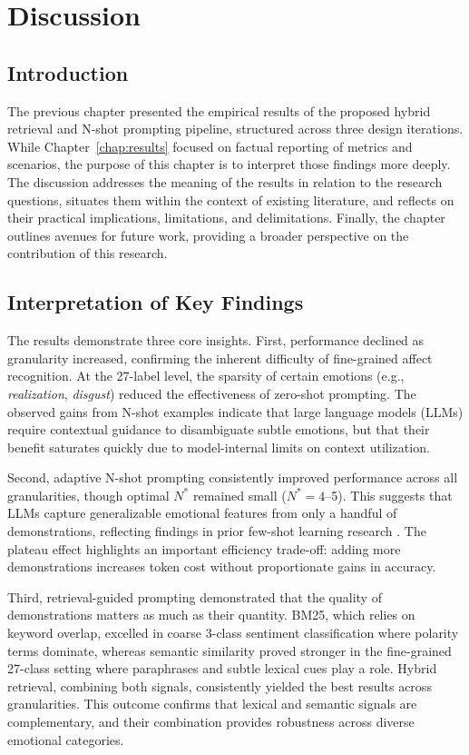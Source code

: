 \chapter{Discussion}
\label{chap:discussion}
\section{Introduction}
The previous chapter presented the empirical results of the proposed hybrid retrieval and N-shot prompting pipeline, structured across three design iterations. While Chapter~\ref{chap:results} focused on factual reporting of metrics and scenarios, the purpose of this chapter is to interpret those findings more deeply. The discussion addresses the meaning of the results in relation to the research questions, situates them within the context of existing literature, and reflects on their practical implications, limitations, and delimitations. Finally, the chapter outlines avenues for future work, providing a broader perspective on the contribution of this research.

\section{Interpretation of Key Findings}
The results demonstrate three core insights. First, performance declined as granularity increased, confirming the inherent difficulty of fine-grained affect recognition. At the 27-label level, the sparsity of certain emotions (e.g., \textit{realization}, \textit{disgust}) reduced the effectiveness of zero-shot prompting. The observed gains from N-shot examples indicate that large language models (LLMs) require contextual guidance to disambiguate subtle emotions, but that their benefit saturates quickly due to model-internal limits on context utilization.  

Second, adaptive N-shot prompting consistently improved performance across all granularities, though optimal $N^{\ast}$ remained small ($N^{\ast}=4$--5). This suggests that LLMs capture generalizable emotional features from only a handful of demonstrations, reflecting findings in prior few-shot learning research \cite{brown2020gpt3}. The plateau effect highlights an important efficiency trade-off: adding more demonstrations increases token cost without proportionate gains in accuracy.  

Third, retrieval-guided prompting demonstrated that the quality of demonstrations matters as much as their quantity. BM25, which relies on keyword overlap, excelled in coarse 3-class sentiment classification where polarity terms dominate, whereas semantic similarity proved stronger in the fine-grained 27-class setting where paraphrases and subtle lexical cues play a role. Hybrid retrieval, combining both signals, consistently yielded the best results across granularities. This outcome confirms that lexical and semantic signals are complementary, and their combination provides robustness across diverse emotional categories.

